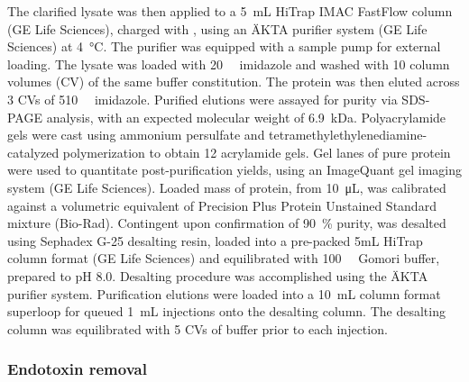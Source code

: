 \begin{refsection}
The clarified lysate was then applied to a \SI{5}{\mL} HiTrap IMAC FastFlow
column (GE Life Sciences), charged with , using an \"{A}KTA purifier
system (GE Life Sciences) at \SI{4}{\celsius}. The purifier was equipped with a
sample pump for external loading. The lysate was loaded with
\SI{20}{\milli\moLar} imidazole and washed with 10 column volumes (CV) of the
same buffer constitution. The protein was then eluted across 3 CVs of
\SI{510}{\milli\moLar} imidazole. Purified elutions were assayed for purity via
SDS-PAGE analysis, with an expected molecular weight of \SI{6.9}{\kilo\dalton}.
Polyacrylamide gels were cast using ammonium persulfate and
tetramethylethylenediamine-catalyzed polymerization to obtain \SI{12}{\wtper}
acrylamide gels. Gel lanes of pure protein were used to quantitate
post-purification yields, using an ImageQuant gel imaging system (GE Life
Sciences). Loaded mass of protein, from \SI{10}{\uL}, was calibrated against a
volumetric equivalent of Precision Plus Protein Unstained Standard mixture
(Bio-Rad). Contingent upon confirmation of \SI{90}{\percent} purity, was
desalted using Sephadex G-25 desalting resin, loaded into a pre-packed 5mL
HiTrap column format (GE Life Sciences) and equilibrated with
\SI{100}{\milli\moLar} Gomori buffer, prepared to pH 8.0. Desalting procedure
was accomplished using the \"{A}KTA purifier system. Purification elutions were
loaded into a \SI{10}{\mL} column format superloop for queued \SI{1}{\mL}
injections onto the desalting column. The desalting column was equilibrated with
5 CVs of buffer prior to each injection.

\subsubsection{Endotoxin removal}


\end{refsection}
